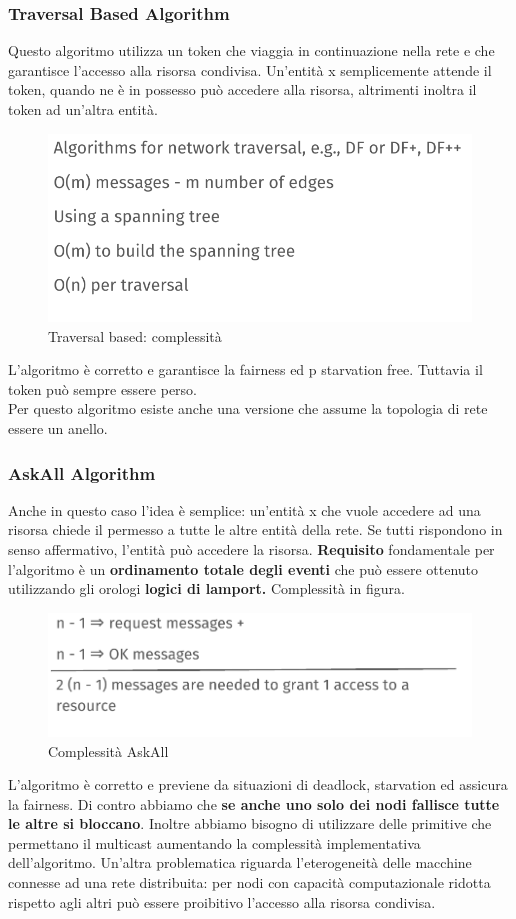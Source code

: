\documentclass[12pt]{article}
\begin{document}
    	\subsubsection{Traversal Based Algorithm}
    		Questo algoritmo utilizza un token che viaggia in continuazione nella rete e che garantisce l'accesso alla risorsa condivisa. Un'entità x semplicemente attende il token, quando ne è in possesso può accedere alla risorsa, altrimenti inoltra il token ad un'altra entità.
    		\begin{figure}[h!]
    			\centering
    			\includegraphics[scale=0.4]{img/mutual.png}
    			\caption{Traversal based: complessità}
    		\end{figure}
    		L'algoritmo è corretto e garantisce la fairness ed p starvation free. Tuttavia il token può sempre essere perso.\\
    		Per questo algoritmo esiste anche una versione che assume la topologia di rete essere un anello.
    	\subsubsection{AskAll Algorithm}
    		Anche in questo caso l'idea è semplice: un'entità x che vuole accedere ad una risorsa chiede il permesso a tutte le altre entità della rete. Se tutti rispondono in senso affermativo, l'entità può accedere la risorsa. \textbf{Requisito} fondamentale per l'algoritmo è un \textbf{ordinamento totale degli eventi} che può essere ottenuto utilizzando gli orologi \textbf{logici di lamport.} Complessità in figura.
    		\begin{figure}[h!]
    			\centering
    			\includegraphics[scale=0.4]{img/askallcomp.png}
    			\caption{Complessità AskAll}
    		\end{figure}
    		L'algoritmo è corretto e previene da situazioni di deadlock, starvation ed assicura la fairness. Di contro abbiamo che \textbf{se anche uno solo dei nodi fallisce tutte le altre si bloccano}. Inoltre abbiamo bisogno di utilizzare delle primitive che permettano il multicast aumentando la complessità implementativa dell'algoritmo. Un'altra problematica riguarda l'eterogeneità delle macchine connesse ad una rete distribuita: per nodi con capacità computazionale ridotta rispetto agli altri può essere proibitivo l'accesso alla risorsa condivisa.
\end{document}
